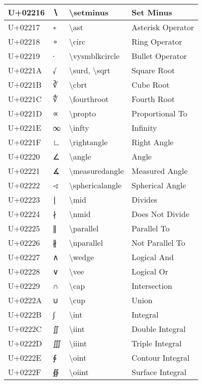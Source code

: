 \begin{table}[h]
\begin{tabulary}{\linewidth}{|L|L|L|L|}
\hline
U+02216 & ∖ & {\textbackslash}setminus & Set Minus \\
\hline
U+02217 & ∗ & {\textbackslash}ast & Asterisk Operator \\
\hline
U+02218 & ∘ & {\textbackslash}circ & Ring Operator \\
\hline
U+02219 & ∙ & {\textbackslash}vysmblkcircle & Bullet Operator \\
\hline
U+0221A & √ & {\textbackslash}surd, {\textbackslash}sqrt & Square Root \\
\hline
U+0221B & ∛ & {\textbackslash}cbrt & Cube Root \\
\hline
U+0221C & ∜ & {\textbackslash}fourthroot & Fourth Root \\
\hline
U+0221D & ∝ & {\textbackslash}propto & Proportional To \\
\hline
U+0221E & ∞ & {\textbackslash}infty & Infinity \\
\hline
U+0221F & ∟ & {\textbackslash}rightangle & Right Angle \\
\hline
U+02220 & ∠ & {\textbackslash}angle & Angle \\
\hline
U+02221 & ∡ & {\textbackslash}measuredangle & Measured Angle \\
\hline
U+02222 & ∢ & {\textbackslash}sphericalangle & Spherical Angle \\
\hline
U+02223 & ∣ & {\textbackslash}mid & Divides \\
\hline
U+02224 & ∤ & {\textbackslash}nmid & Does Not Divide \\
\hline
U+02225 & ∥ & {\textbackslash}parallel & Parallel To \\
\hline
U+02226 & ∦ & {\textbackslash}nparallel & Not Parallel To \\
\hline
U+02227 & ∧ & {\textbackslash}wedge & Logical And \\
\hline
U+02228 & ∨ & {\textbackslash}vee & Logical Or \\
\hline
U+02229 & ∩ & {\textbackslash}cap & Intersection \\
\hline
U+0222A & ∪ & {\textbackslash}cup & Union \\
\hline
U+0222B & ∫ & {\textbackslash}int & Integral \\
\hline
U+0222C & ∬ & {\textbackslash}iint & Double Integral \\
\hline
U+0222D & ∭ & {\textbackslash}iiint & Triple Integral \\
\hline
U+0222E & ∮ & {\textbackslash}oint & Contour Integral \\
\hline
U+0222F & ∯ & {\textbackslash}oiint & Surface Integral \\

\end{tabulary}
\end{table}

